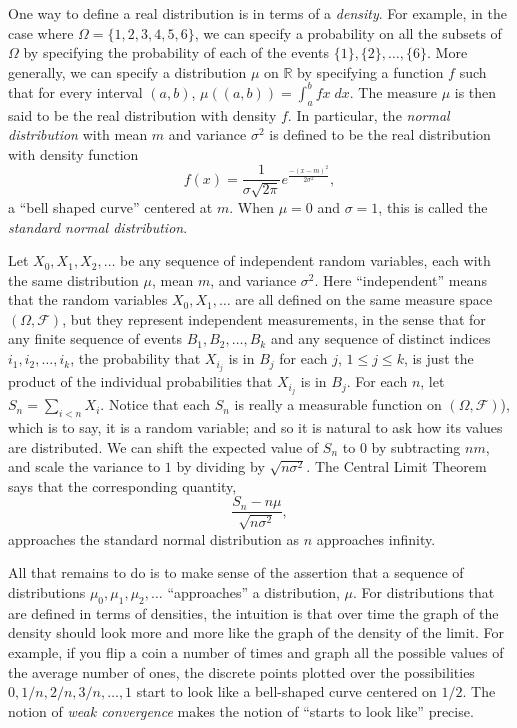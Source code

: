 \documentclass{article}
\newcommand{\RR}{\mathbb{R}}
\newcommand{\mdl}[1]{{\mathcal #1}}
\begin{document}
One way to define a real distribution is in terms of a \emph{density}. For example, in the case where $\Omega = \{1, 2, 3, 4, 5, 6\}$, we can specify a probability on all the subsets of $\Omega$ by specifying the probability of each of the events $\{1\}, \{2\}, \ldots, \{6\}$. More generally, we can specify a distribution $\mu$ on $\RR$ by specifying a function $f$ such that for every interval $(a, b)$, $\mu((a, b)) = \int_a^b f x \; \mathit{dx}$. The measure $\mu$ is then said to be the real distribution with density $f$. In particular, the \emph{normal distribution} with mean $m$ and variance $\sigma^2$ is defined to be the real distribution with density function
\[
f(x) = \frac{1}{\sigma \sqrt{2 \pi}} e^\frac{-(x - m)^2}{2 \sigma^2}, 
\]
a ``bell shaped curve'' centered at $m$. When $\mu = 0$ and $\sigma = 1$, this is called the \emph{standard normal distribution}.

Let $X_0, X_1, X_2, \ldots$ be any sequence of independent random variables, each with the same distribution $\mu$, mean $m$, and variance $\sigma^2$. Here ``independent'' means that the random variables $X_0, X_1, \ldots$ are all defined on the same measure space $(\Omega, \mdl F)$, but they represent independent measurements, in the sense that for any finite sequence of events $B_1, B_2, \ldots, B_k$ and any sequence of distinct indices $i_1, i_2, \ldots, i_k$, the probability that $X_{i_j}$ is in $B_j$ for each $j$, $1 \leq j \leq k$, is just the product of the individual probabilities that $X_{i_j}$ is in $B_j$. For each $n$, let $S_n = \sum_{i < n} X_i$. Notice that each $S_n$ is really a measurable function on $(\Omega, \mdl F)$), which is to say, it is a random variable; and so it is natural to ask how its values are distributed. We can shift the expected value of $S_n$ to $0$ by subtracting $n m$, and scale the variance to $1$ by dividing by $\sqrt{ n \sigma^2}$. The Central Limit Theorem says that the corresponding quantity,
\[
 \frac{S_n - n \mu}{\sqrt{n \sigma^2}},
\]
approaches the standard normal distribution as $n$ approaches infinity.

All that remains to do is to make sense of the assertion that a sequence of distributions $\mu_0, \mu_1, \mu_2, \ldots$ ``approaches'' a distribution, $\mu$. For distributions that are defined in terms of densities, the intuition is that over time the graph of the density should look more and more like the graph of the density of the limit. For example, if you flip a coin a number of times and graph all the possible values of the average number of ones, the discrete points plotted over the possibilities $0, 1/n, 2/n, 3/n, \ldots, 1$ start to look like a bell-shaped curve centered on $1 / 2$. The notion of \emph{weak convergence} makes the notion of ``starts to look like'' precise.
\end{document}
